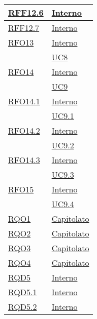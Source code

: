 \begin{longtable}{|>{\centering}m{5cm}|m{5cm}<{\centering}|}
\hyperlink{RFF12.6}{RFF12.6} & \hyperlink{Interno}{Interno}\\ \hline

\hyperlink{RFF12.7}{RFF12.7} & \hyperlink{Interno}{Interno}\\ \hline

\hyperlink{RFO13}{RFO13} & \hyperlink{Interno}{Interno}\\
& \hyperref[UC8]{UC8}\\ \hline

\hyperlink{RFO14}{RFO14} & \hyperlink{Interno}{Interno}\\
& \hyperref[UC9]{UC9}\\ \hline

\hyperlink{RFO14.1}{RFO14.1} & \hyperlink{Interno}{Interno}\\
& \hyperref[UC9.1]{UC9.1}\\ \hline

\hyperlink{RFO14.2}{RFO14.2} & \hyperlink{Interno}{Interno}\\
& \hyperref[UC9.2]{UC9.2}\\ \hline

\hyperlink{RFO14.3}{RFO14.3} & \hyperlink{Interno}{Interno}\\
& \hyperref[UC9.3]{UC9.3}\\ \hline

\hyperlink{RFO15}{RFO15} & \hyperlink{Interno}{Interno}\\
& \hyperref[UC9.4]{UC9.4}\\ \hline

\hyperlink{RQO1}{RQO1} & \hyperlink{Capitolato}{Capitolato}\\ \hline

\hyperlink{RQO2}{RQO2} & \hyperlink{Capitolato}{Capitolato}\\ \hline

\hyperlink{RQO3}{RQO3} & \hyperlink{Capitolato}{Capitolato}\\ \hline

\hyperlink{RQO4}{RQO4} & \hyperlink{Capitolato}{Capitolato}\\ \hline

\hyperlink{RQD5}{RQD5} & \hyperlink{Interno}{Interno}\\ \hline

\hyperlink{RQD5.1}{RQD5.1} & \hyperlink{Interno}{Interno}\\ \hline

\hyperlink{RQD5.2}{RQD5.2} & \hyperlink{Interno}{Interno}\\ \hline


\end{longtable}
